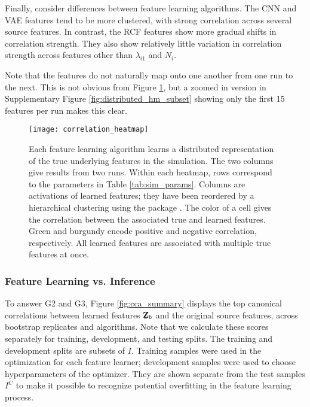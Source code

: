 Finally, consider differences between feature learning algorithms. The CNN and
VAE features tend to be more clustered, with strong correlation across several
source features. In contrast, the RCF features show more gradual shifts in
correlation strength. They also show relatively little variation in correlation
strength across features other than $\lambda_{i1}$ and $N_{i}$.

Note that the features do not naturally map onto one another from one run to the
next. This is not obvious from Figure \ref{fig:distributed_hm}, but a zoomed in
version in Supplementary Figure \ref{fig:distributed_hm_subset} showing only the
first 15 features per run makes this clear.

\begin{figure}
  \centering
  \texttt{[image: correlation\_heatmap]}
  \caption{Each feature learning algorithm learns a distributed
    representation of the true underlying features in the simulation. The two
    columns give results from two runs. Within each heatmap, rows correspond to
    the parameters in Table \ref{tab:sim_params}. Columns are activations of
    learned features; they have been reordered by a hierarchical clustering
    using the package \citep{barter2018superheat}. The color of a cell gives the
    correlation between the associated true and learned features. Green and
    burgundy encode positive and negative correlation, respectively. All learned
    features are associated with multiple true features at once.}
  \label{fig:distributed_hm}
\end{figure}

\subsubsection{Feature Learning vs. Inference}

To answer G2 and G3, Figure \ref{fig:cca_summary} displays the top canonical
correlations between learned features $\underaccent{\bar}{\mathbf{Z}}_{b}$ and
the original source features, across bootstrap replicates and algorithms. Note
that we calculate these scores separately for training, development, and testing
splits. The training and development splits are subsets of $I$. Training samples
were used in the optimization for each feature learner; development samples were
used to choose hyperparameters of the optimizer. They are shown separate from
the test samples $I^{C}$ to make it possible to recognize potential overfitting
in the feature learning process.


